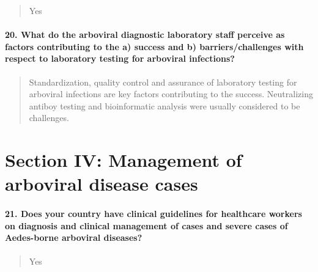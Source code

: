 \documentclass[
]{article}
\begin{document}
\begin{quote}
Yes
\end{quote}

\hypertarget{what-do-the-arboviral-diagnostic-laboratory-staff-perceive-as-factors-contributing-to-the-a-success-and-b-barrierschallenges-with-respect-to-laboratory-testing-for-arboviral-infections}{%
\paragraph{20. What do the arboviral diagnostic laboratory staff
perceive as factors contributing to the a) success and b)
barriers/challenges with respect to laboratory testing for arboviral
infections?}\label{what-do-the-arboviral-diagnostic-laboratory-staff-perceive-as-factors-contributing-to-the-a-success-and-b-barrierschallenges-with-respect-to-laboratory-testing-for-arboviral-infections}}

\begin{quote}
Standardization, quality control and assurance of laboratory testing for
arboviral infections are key factors contributing to the success.
Neutralizing antiboy testing and bioinformatic analysis were usually
considered to be challenges.
\end{quote}

\hypertarget{section-iv-management-of-arboviral-disease-cases}{%
\section{Section IV: Management of arboviral disease
cases}\label{section-iv-management-of-arboviral-disease-cases}}

\hypertarget{does-your-country-have-clinical-guidelines-for-healthcare-workers-on-diagnosis-and-clinical-management-of-cases-and-severe-cases-of-aedes-borne-arboviral-diseases}{%
\paragraph{21. Does your country have clinical guidelines for healthcare
workers on diagnosis and clinical management of cases and severe cases
of Aedes-borne arboviral
diseases?}\label{does-your-country-have-clinical-guidelines-for-healthcare-workers-on-diagnosis-and-clinical-management-of-cases-and-severe-cases-of-aedes-borne-arboviral-diseases}}

\begin{quote}
Yes
\end{quote}
\end{document}
